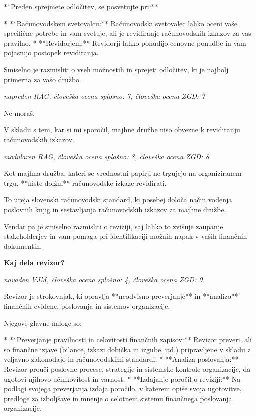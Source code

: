 \documentclass[a4paper,12pt,openright]{book}
\begin{document}
**Preden sprejmete odločitev, se posvetujte pri:**

* **Računovodskem svetovalcu:** Računovodski svetovalec lahko oceni vaše specifične potrebe in vam svetuje, ali je revidiranje računovodskih izkazov za vas pravilno.
* **Revidorjem:** Revidorji lahko ponudijo cenovne ponudbe in vam pojasnijo postopek revidiranja.


Smiselno je razmisliti o vseh možnostih in sprejeti odločitev, ki je najbolj primerna za vašo družbo.

\vspace{0.5cm}
\textit{napreden RAG, človeška ocena splošno: 7, človeška ocena ZGD: 7}

Ne moraš.

V skladu s tem, kar si mi sporočil, majhne družbe niso obvezne k revidiranju računovodskih izkazov.

\vspace{0.5cm}
\textit{modularen RAG, človeška ocena splošno: 8, človeška ocena ZGD: 8}

Kot majhna družba, kateri se vrednostni papirji ne trgujejo na organiziranem trgu, **niste dolžni**  računovodske izkaze revidirati.

To ureja slovenski računovodski standard, ki posebej določa način vodenja poslovnih knjig in sestavljanja računovodskih izkazov za majhne družbe.


Vendar pa je smiselno razmisliti o reviziji, saj lahko  to zvišuje zaupanje stakeholderjev in vam pomaga pri identifikaciji možnih napak v vaših finančnih dokumentih.

\vspace{0.5cm}
\textbf{Kaj dela revizor?}

\textit{navaden VJM, človeška ocena splošno: 4, človeška ocena ZGD: 0}

Revizor je strokovnjak, ki opravlja **neodvisno preverjanje** in **analizo** finančnih evidenc, poslovanja in sistemov organizacije.

Njegove glavne naloge so:

* **Preverjanje pravilnosti in celovitosti finančnih zapisov:** Revizor preveri, ali so finančne izjave (bilance, izkazi dobička in izgube, itd.) pripravljene v skladu z veljavno zakonodajo in računovodskimi standardi.
* **Analiza poslovanja:** Revizor prouči poslovne procese, strategije in sistemske kontrole organizacije, da ugotovi njihovo učinkovitost in varnost.
* **Izdajanje poročil o reviziji:** Na podlagi svojega preverjanja izdaja poročilo, v katerem opiše svoja ugotovitve, predloge za izboljšave in mnenje o celotnem sistemu finančnega poslovanja organizacije.
\end{document}
